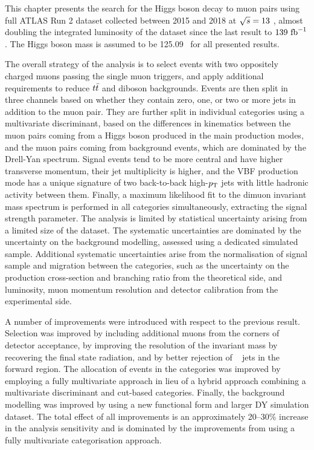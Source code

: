 This chapter presents the search for the Higgs boson decay to muon
pairs using full ATLAS Run 2 dataset collected between 2015 and 2018
at $\sqrt{s} = 13$ \TeV, almost doubling the integrated luminosity of
the dataset since the last result to $139~\text{fb}^{-1}$. The Higgs boson mass
is assumed to be 125.09 \GeV~for all presented results.

The overall strategy of the analysis is to select events with
two oppositely charged muons passing the single muon triggers,
and apply additional requirements
to reduce $t\bar{t}$ and diboson backgrounds. Events are then split
in three channels based on whether they contain zero, one, or two or
more jets in addition to the muon pair. They are further split in
individual categories using a multivariate discriminant, based
on the differences in kinematics between the muon pairs coming
from a Higgs boson produced in the main production modes, and the
muon pairs coming from background events, which are dominated by
the Drell-Yan spectrum. Signal events tend to be more central and
have higher transverse momentum, their jet multiplicity is higher,
and the VBF production mode has a unique signature of two 
back-to-back high-$p_{\text{T}}$ jets with little hadronic activity between
them. Finally, a maximum likelihood fit to the dimuon invariant mass
spectrum is performed in all categories simultaneously, extracting
the signal strength parameter. The analysis is limited by
statistical uncertainty arising from a limited size of the dataset.
The systematic uncertainties are dominated by the uncertainty on
the background modelling, assessed using a dedicated simulated sample.
Additional systematic uncertainties arise from the normalisation 
of signal sample and migration between the categories, such as
the uncertainty on the production cross-section and branching ratio
from the theoretical side, and luminosity, muon momentum resolution
and detector calibration from the experimental side.

A number of improvements were introduced with respect to the
previous result. Selection was improved by including additional
muons from the corners of detector acceptance, by improving
the resolution of the invariant mass by recovering the final
state radiation, and by better rejection of \pileup~ jets in the
forward region. The allocation of events in the categories was
improved by employing a fully multivariate approach in lieu
of a hybrid approach combining a multivariate discriminant and 
cut-based categories. Finally, the background modelling was
improved by using a new functional form and larger DY simulation
dataset. The total effect of all improvements is an approximately
20--30\% increase in the analysis sensitivity and is dominated
by the improvements from using a fully multivariate categorisation
approach.

